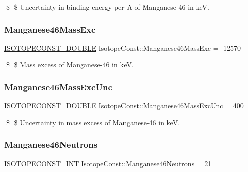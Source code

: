 \$ \$ Uncertainty in binding energy per A of Manganese-\/46 in keV. \mbox{\label{group___isotope_const-_manganese-_mn46_ga89c83f5b0b1227b12597121b02b189dc}} 
\subsubsection{\texorpdfstring{Manganese46\+Mass\+Exc}{Manganese46MassExc}}
{\footnotesize\ttfamily \mbox{\hyperlink{group___isotope_const-_macros_ga8f45a7272ce02c0b4c65c44636ed719a}{I\+S\+O\+T\+O\+P\+E\+C\+O\+N\+S\+T\+\_\+\+D\+O\+U\+B\+LE}} Isotope\+Const\+::\+Manganese46\+Mass\+Exc = -\/12570}

\$ \$ Mass excess of Manganese-\/46 in keV. \mbox{\label{group___isotope_const-_manganese-_mn46_gae249e9f74260aabd4c170bc2c7dc8445}} 
\subsubsection{\texorpdfstring{Manganese46\+Mass\+Exc\+Unc}{Manganese46MassExcUnc}}
{\footnotesize\ttfamily \mbox{\hyperlink{group___isotope_const-_macros_ga8f45a7272ce02c0b4c65c44636ed719a}{I\+S\+O\+T\+O\+P\+E\+C\+O\+N\+S\+T\+\_\+\+D\+O\+U\+B\+LE}} Isotope\+Const\+::\+Manganese46\+Mass\+Exc\+Unc = 400}

\$ \$ Uncertainty in mass excess of Manganese-\/46 in keV. \mbox{\label{group___isotope_const-_manganese-_mn46_gaca758ecd628b140a9e0717aac8f4553d}} 
\subsubsection{\texorpdfstring{Manganese46\+Neutrons}{Manganese46Neutrons}}
{\footnotesize\ttfamily \mbox{\hyperlink{group___isotope_const-_macros_ga5f18360b3e99483a35c32d789e62621c}{I\+S\+O\+T\+O\+P\+E\+C\+O\+N\+S\+T\+\_\+\+I\+NT}} Isotope\+Const\+::\+Manganese46\+Neutrons = 21}

